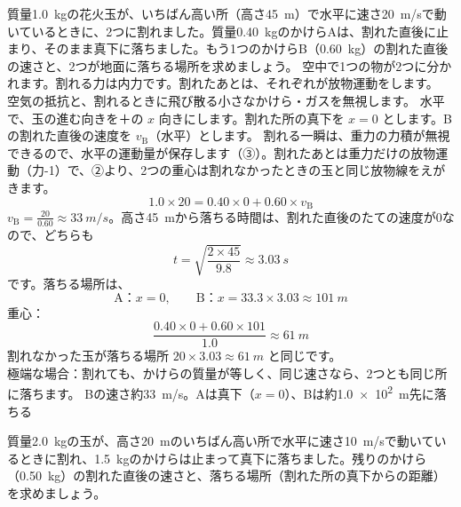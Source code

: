\label{ph:力-3:ex7}
\begin{phreidai}[空中で割れる花火]
質量\qty{1.0}{kg}の花火玉が、いちばん高い所（高さ\qty{45}{m}）で水平に速さ\qty{20}{m/s}で動いているときに、2つに割れました。質量\qty{0.40}{kg}のかけらAは、割れた直後に止まり、そのまま真下に落ちました。もう1つのかけらB（\qty{0.60}{kg}）の割れた直後の速さと、2つが地面に落ちる場所を求めましょう。
\phbamen
空中で1つの物が2つに分かれます。割れる力は内力です。割れたあとは、それぞれが放物運動をします。
\phmushi
空気の抵抗と、割れるときに飛び散る小さなかけら・ガスを無視します。
\phzu
水平で、玉の進む向きを＋の $x$ 向きにします。割れた所の真下を $x=0$ とします。Bの割れた直後の速度を $v_{\mathrm B}$（水平）とします。
\phriyu
割れる一瞬は、重力の力積が無視できるので、水平の運動量が保存します（③）。割れたあとは重力だけの放物運動（力-1）で、②より、2つの重心は割れなかったときの玉と同じ放物線をえがきます。
\phtateru
\[1.0\times20=0.40\times0+0.60\times v_{\mathrm B}\]
\phtoku
$v_{\mathrm B}=\tfrac{20}{0.60}\approx\qty{33}{m/s}$。高さ\qty{45}{m}から落ちる時間は、割れた直後のたての速度が0なので、どちらも
\[t=\sqrt{\frac{2\times45}{9.8}}\approx\qty{3.03}{s}\]
です。落ちる場所は、
\[\text{A：}x=0,\qquad \text{B：}x=33.3\times3.03\approx\qty{101}{m}\]
\phtashikame
重心：
\[\frac{0.40\times0+0.60\times101}{1.0}\approx\qty{61}{m}\]
割れなかった玉が落ちる場所 $20\times3.03\approx\qty{61}{m}$ と同じです。\\
極端な場合：割れても、かけらの質量が等しく、同じ速さなら、2つとも同じ所に落ちます。
\kotae Bの速さ約\qty{33}{m/s}。Aは真下（$x=0$）、Bは約\qty{1.0e2}{m}先に落ちる
\end{phreidai}
\begin{jibun}
質量\qty{2.0}{kg}の玉が、高さ\qty{20}{m}のいちばん高い所で水平に速さ\qty{10}{m/s}で動いているときに割れ、\qty{1.5}{kg}のかけらは止まって真下に落ちました。残りのかけら（\qty{0.50}{kg}）の割れた直後の速さと、落ちる場所（割れた所の真下からの距離）を求めましょう。
\end{jibun}


